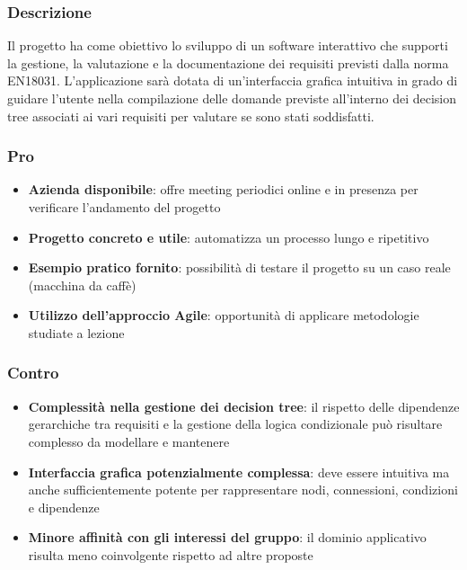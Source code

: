 \documentclass[11pt,a4paper]{article}
\begin{document}
\subsubsection{Descrizione}
Il progetto ha come obiettivo lo sviluppo di un software interattivo che supporti la gestione, la valutazione e la documentazione dei requisiti previsti dalla norma EN18031. L'applicazione sarà dotata di un'interfaccia grafica intuitiva in grado di guidare l'utente nella compilazione delle domande previste all'interno dei decision tree associati ai vari requisiti per valutare se sono stati soddisfatti.

\subsubsection{Pro}
\begin{itemize}
    \item \textbf{Azienda disponibile}: offre meeting periodici online e in presenza per verificare l'andamento del progetto
    \item \textbf{Progetto concreto e utile}: automatizza un processo lungo e ripetitivo
    \item \textbf{Esempio pratico fornito}: possibilità di testare il progetto su un caso reale (macchina da caffè)
    \item \textbf{Utilizzo dell'approccio Agile}: opportunità di applicare metodologie studiate a lezione
\end{itemize}

\subsubsection{Contro}
\begin{itemize}
    \item \textbf{Complessità nella gestione dei decision tree}: il rispetto delle dipendenze gerarchiche tra requisiti e la gestione della logica condizionale può risultare complesso da modellare e mantenere
    \item \textbf{Interfaccia grafica potenzialmente complessa}: deve essere intuitiva ma anche sufficientemente potente per rappresentare nodi, connessioni, condizioni e dipendenze
    \item \textbf{Minore affinità con gli interessi del gruppo}: il dominio applicativo risulta meno coinvolgente rispetto ad altre proposte
\end{itemize}

\vspace{0.5cm}
\end{document}
